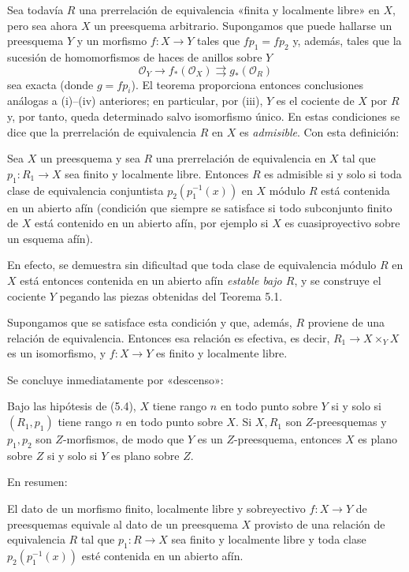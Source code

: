 Sea todavía $R$ una prerrelación de equivalencia «finita y localmente libre»
en $X$, pero sea ahora $X$ un preesquema arbitrario. Supongamos que puede
hallarse un preesquema $Y$ y un morfismo $f:X\to Y$ tales que $fp_1=fp_2$ y,
además, tales que la sucesión de homomorfismos de haces de anillos sobre $Y$
\[
  \mathcal O_Y\longrightarrow f_*(\mathcal O_X)
  \rightrightarrows g_*(\mathcal O_R)
\]
sea exacta (donde $g=fp_i$). El teorema proporciona entonces conclusiones
análogas a (i)--(iv) anteriores; en particular, por (iii), $Y$ es el cociente
de $X$ por $R$ y, por tanto, queda determinado salvo isomorfismo único. En
estas condiciones se dice que la prerrelación de equivalencia $R$ en $X$ es
\emph{admisible}. Con esta definición:

 Sea $X$ un preesquema y sea $R$ una prerrelación de
equivalencia en $X$ tal que $p_1:R_1\to X$ sea finito y localmente libre.
Entonces $R$ es admisible si y solo si toda clase de equivalencia conjuntista
$p_2(p_1^{-1}(x))$ en $X$ módulo $R$ está contenida en un abierto afín
(condición que siempre se satisface si todo subconjunto finito de $X$ está
contenido en un abierto afín, por ejemplo si $X$ es cuasiproyectivo sobre un
esquema afín).

En efecto, se demuestra sin dificultad que toda clase de equivalencia módulo
$R$ en $X$ está entonces contenida en un abierto afín \emph{estable bajo
$R$}, y se construye el cociente $Y$ pegando las piezas obtenidas del Teorema
5.1.

 Supongamos que se satisface esta condición y que,
además, $R$ proviene de una relación de equivalencia. Entonces esa relación es
efectiva, es decir, $R_1\to X\times_Y X$ es un isomorfismo, y $f:X\to Y$ es
finito y localmente libre.

Se concluye inmediatamente por «descenso»:

 Bajo las hipótesis de (5.4), $X$ tiene rango $n$ en
todo punto sobre $Y$ si y solo si $(R_1,p_1)$ tiene rango $n$ en todo punto
sobre $X$. Si $X,R_1$ son $Z$-preesquemas y $p_1,p_2$ son $Z$-morfismos, de
modo que $Y$ es un $Z$-preesquema, entonces $X$ es plano sobre $Z$ si y solo
si $Y$ es plano sobre $Z$.

En resumen:

 El dato de un morfismo finito, localmente libre y
sobreyectivo $f:X\to Y$ de preesquemas equivale al dato de un preesquema $X$
provisto de una relación de equivalencia $R$ tal que $p_1:R\to X$ sea finito
y localmente libre y toda clase $p_2(p_1^{-1}(x))$ esté contenida en un
abierto afín.

